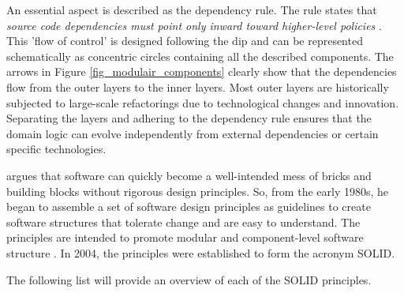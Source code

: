 An essential aspect is described as the dependency rule. The rule states that
\textit{source code dependencies must point only inward toward higher-level policies}
\textcite[206]{r_c_martin_clean_2018}. This ’flow of control’ is designed following the
\gls{dip} and can be represented schematically as concentric circles containing all the
described components. The arrows in Figure \ref{fig_modulair_components} clearly show that
the dependencies flow from the outer layers to the inner layers. Most outer layers are
historically subjected to large-scale refactorings due to technological changes and
innovation. Separating the layers and adhering to the dependency rule ensures that the
domain logic can evolve independently from external dependencies or certain specific
technologies.

\textcite[78]{r_c_martin_clean_2018} argues that software can quickly become a
well-intended mess of bricks and building blocks without rigorous design principles. So,
from the early 1980s, he began to assemble a set of software design principles as
guidelines to create software structures that tolerate change and are easy to understand.
The principles are intended to promote modular and component-level software structure
\parencite[79]{r_c_martin_clean_2018}. In 2004, the principles were established to form
the acronym SOLID. 

The following list will provide an overview of each of the SOLID principles.

